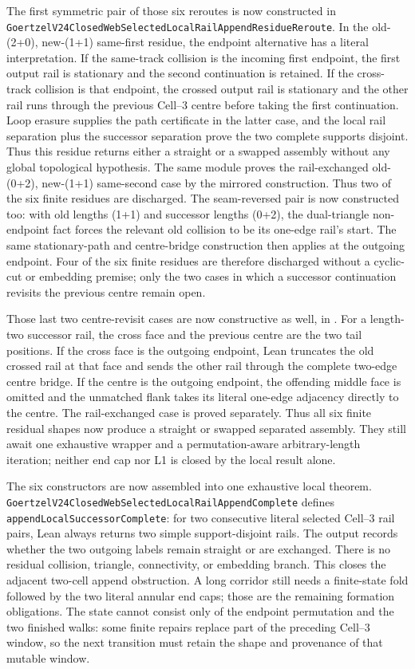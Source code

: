 \documentclass[11pt]{article}
\theoremstyle{definition}
\begin{document}
The first symmetric pair of those six reroutes is now constructed in
\texttt{GoertzelV24ClosedWebSelectedLocalRailAppendResidueReroute}.  In the
old-(2+0), new-(1+1) same-first residue, the endpoint alternative has a
literal interpretation.  If the same-track collision is the incoming first
endpoint, the first output rail is stationary and the second continuation is
retained.  If the cross-track collision is that endpoint, the crossed output
rail is stationary and the other rail runs through the previous Cell--3
centre before taking the first continuation.  Loop erasure supplies the path
certificate in the latter case, and the local rail separation plus the
successor separation prove the two complete supports disjoint.  Thus this
residue returns either a straight or a swapped assembly without any global
topological hypothesis.  The same module proves the rail-exchanged old-(0+2),
new-(1+1) same-second case by the mirrored construction.  Thus two of the six
finite residues are discharged.  The seam-reversed pair is now constructed
too: with old lengths (1+1) and successor lengths (0+2), the dual-triangle
non-endpoint fact forces the relevant old collision to be its one-edge rail's
start.  The same stationary-path and centre-bridge construction then applies
at the outgoing endpoint.  Four of the six finite residues are therefore
discharged without a cyclic-cut or embedding premise; only the two cases in
which a successor continuation revisits the previous centre remain open.

Those last two centre-revisit cases are now constructive as well, in
.
For a length-two successor rail, the cross face and the previous centre are
the two tail positions.  If the cross face is the outgoing endpoint, Lean
truncates the old crossed rail at that face and sends the other rail through
the complete two-edge centre bridge.  If the centre is the outgoing endpoint,
the offending middle face is omitted and the unmatched flank takes its
literal one-edge adjacency directly to the centre.  The rail-exchanged case
is proved separately.  Thus all six finite residual shapes now produce a
straight or swapped separated assembly.  They still await one exhaustive
wrapper and a permutation-aware arbitrary-length iteration; neither end cap
nor L1 is closed by the local result alone.

The six constructors are now assembled into one exhaustive local theorem.
\texttt{GoertzelV24ClosedWebSelectedLocalRailAppendComplete} defines
\texttt{appendLocalSuccessorComplete}: for two consecutive literal selected
Cell--3 rail pairs, Lean always returns two simple support-disjoint rails.
The output records whether the two outgoing labels remain straight or are
exchanged.  There is no residual collision, triangle, connectivity, or
embedding branch.  This closes the adjacent two-cell append obstruction.  A
long corridor still needs a finite-state fold followed by the two literal
annular end caps; those are the remaining formation obligations.  The state
cannot consist only of the endpoint permutation and the two finished walks:
some finite repairs replace part of the preceding Cell--3 window, so the next
transition must retain the shape and provenance of that mutable window.
\end{document}

